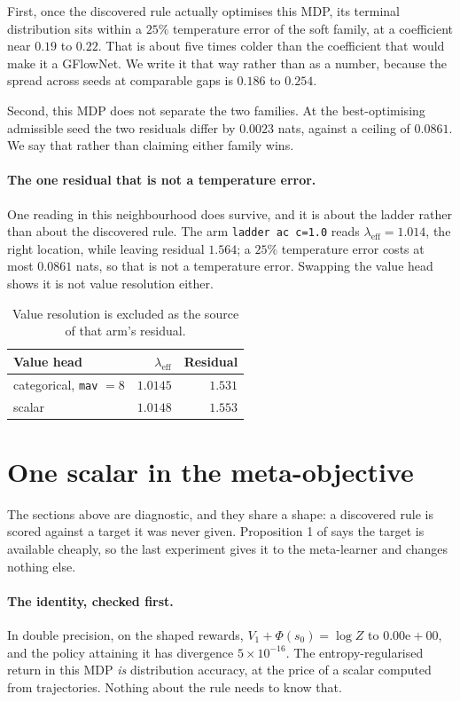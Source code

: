 \documentclass[11pt]{article}
\theoremstyle{remark}
\begin{document}
First, once the discovered rule actually optimises this MDP, its terminal
distribution sits within a $25\%$ temperature error of the soft family, at a
coefficient near $0.19$ to $0.22$. That is about five times colder than the
coefficient that would make it a GFlowNet. We write it that way rather than as a
number, because the spread across seeds at comparable gaps is $0.186$ to $0.254$.

Second, this MDP does not separate the two families. At the best-optimising
admissible seed the two residuals differ by $0.0023$ nats, against a ceiling of
$0.0861$. We say that rather than claiming either family wins.

\paragraph{The one residual that is not a temperature error.} One reading in this
neighbourhood does survive, and it is about the ladder rather than about the
discovered rule. The arm \texttt{ladder ac c=1.0} reads $\lambda_{\mathrm{eff}} =
1.014$, the right location, while leaving residual $1.564$; a $25\%$ temperature
error costs at most $0.0861$ nats, so that is not a temperature error. Swapping
the value head shows it is not value resolution either.

\begin{table}[t]
\centering
\begin{tabular}{lrr}
\toprule
Value head & $\lambda_{\mathrm{eff}}$ & Residual \\
\midrule
categorical, \texttt{mav} $= 8$ & $1.0145$ & $1.531$ \\
scalar & $1.0148$ & $1.553$ \\
\bottomrule
\end{tabular}
\caption{Value resolution is excluded as the source of that arm's residual.}
\label{tab:critic}
\end{table}

\section{One scalar in the meta-objective}\label{sec:scalar}

The sections above are diagnostic, and they share a shape: a discovered rule is
scored against a target it was never given. Proposition 1 of \cite{tiapkin2024}
says the target is available cheaply, so the last experiment gives it to the
meta-learner and changes nothing else.

\paragraph{The identity, checked first.} In double precision, on the shaped
rewards, $V_1 + \Phi(s_0) = \log Z$ to $0.00\mathrm{e}{+}00$, and the policy
attaining it has divergence $5\times 10^{-16}$. The entropy-regularised return in
this MDP \emph{is} distribution accuracy, at the price of a scalar computed from
trajectories. Nothing about the rule needs to know that.
\end{document}

